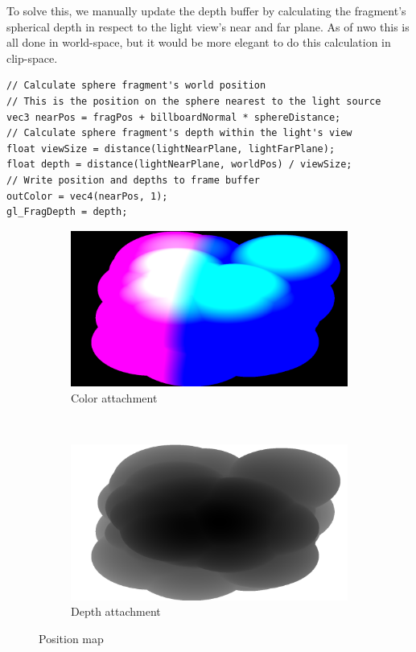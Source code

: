 To solve this, we manually update the depth buffer by calculating the fragment's spherical depth in respect to the light view's near and far plane. As of nwo this is all done in world-space, but it would be more elegant to do this calculation in clip-space.
\begin{lstlisting}[caption={first\_voxelize.glsl, 60}]
// Calculate sphere fragment's world position 
// This is the position on the sphere nearest to the light source
vec3 nearPos = fragPos + billboardNormal * sphereDistance;
// Calculate sphere fragment's depth within the light's view
float viewSize = distance(lightNearPlane, lightFarPlane);
float depth = distance(lightNearPlane, worldPos) / viewSize;
// Write position and depths to frame buffer
outColor = vec4(nearPos, 1);
gl_FragDepth = depth;
\end{lstlisting}

\begin{figure}[t]
\centering
	\begin{subfigure}[t]{0.48\textwidth}
	\includegraphics[width=\textwidth]{../res/positionmapcolor.png}
	\caption{Color attachment}
	\end{subfigure}
	~
	\begin{subfigure}[t]{0.48\textwidth}
	\includegraphics[width=\textwidth]{../res/positionmapdepth.png}
	\caption{Depth attachment}
	\end{subfigure}
\caption{Position map}
\end{figure}

